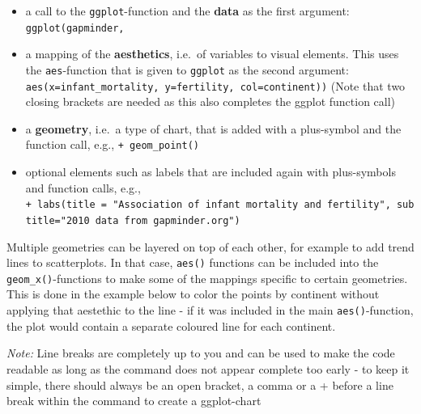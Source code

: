 \documentclass[
]{book}
\newenvironment{Shaded}{\begin{snugshade}}{\end{snugshade}}
\newcommand{\DataTypeTok}[1]{\textcolor[rgb]{0.13,0.29,0.53}{#1}}
\newcommand{\DecValTok}[1]{\textcolor[rgb]{0.00,0.00,0.81}{#1}}
\newcommand{\KeywordTok}[1]{\textcolor[rgb]{0.13,0.29,0.53}{\textbf{#1}}}
\newcommand{\NormalTok}[1]{#1}
\newcommand{\OperatorTok}[1]{\textcolor[rgb]{0.81,0.36,0.00}{\textbf{#1}}}
\newcommand{\StringTok}[1]{\textcolor[rgb]{0.31,0.60,0.02}{#1}}
\providecommand{\tightlist}{%
  \setlength{\itemsep}{0pt}\setlength{\parskip}{0pt}}
\begin{document}
\begin{itemize}
\tightlist
\item
  a call to the \texttt{ggplot}-function and the \textbf{data} as the first argument: \texttt{ggplot(gapminder,}
\item
  a mapping of the \textbf{aesthetics}, i.e.~of variables to visual elements. This uses the \texttt{aes}-function that is given to \texttt{ggplot} as the second argument: \texttt{aes(x=infant\_mortality,\ y=fertility,\ col=continent))} (Note that two closing brackets are needed as this also completes the ggplot function call)
\item
  a \textbf{geometry}, i.e.~a type of chart, that is added with a plus-symbol and the function call, e.g., \texttt{+\ geom\_point()}
\item
  optional elements such as labels that are included again with plus-symbols and function calls, e.g., \texttt{+\ labs(title\ =\ "Association\ of\ infant\ mortality\ and\ fertility",\ subtitle="2010\ data\ from\ gapminder.org")}
\end{itemize}

Multiple geometries can be layered on top of each other, for example to add trend lines to scatterplots. In that case, \texttt{aes()} functions can be included into the \texttt{geom\_x()}-functions to make some of the mappings specific to certain geometries. This is done in the example below to color the points by continent without applying that aestethic to the line - if it was included in the main \texttt{aes()}-function, the plot would contain a separate coloured line for each continent.

\emph{Note:} Line breaks are completely up to you and can be used to make the code readable as long as the command does not appear complete too early - to keep it simple, there should always be an open bracket, a comma or a + before a line break within the command to create a ggplot-chart

\begin{Shaded}
\end{Shaded}
\end{document}
